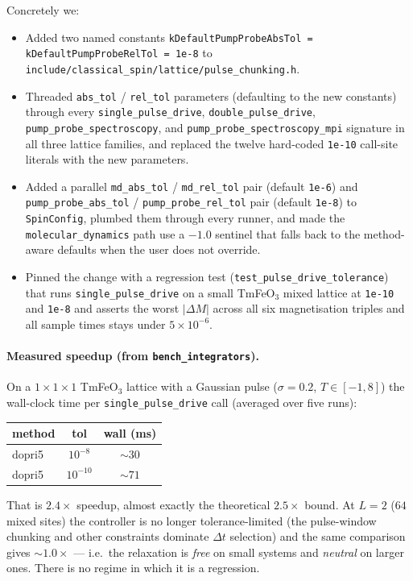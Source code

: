 \documentclass[11pt,letterpaper]{article}
\begin{document}
Concretely we:
\begin{itemize}
  \item Added two named constants
        \texttt{kDefaultPumpProbeAbsTol = kDefaultPumpProbeRelTol
        = 1e-8} to \texttt{include/classical\_spin/lattice/pulse\_chunking.h}.
  \item Threaded \texttt{abs\_tol} / \texttt{rel\_tol} parameters
        (defaulting to the new constants) through every
        \texttt{single\_pulse\_drive}, \texttt{double\_pulse\_drive},
        \texttt{pump\_probe\_spectroscopy}, and
        \texttt{pump\_probe\_spectroscopy\_mpi} signature in all
        three lattice families, and replaced the twelve hard-coded
        \texttt{1e-10} call-site literals with the new parameters.
  \item Added a parallel \texttt{md\_abs\_tol} / \texttt{md\_rel\_tol}
        pair (default \texttt{1e-6}) and
        \texttt{pump\_probe\_abs\_tol} / \texttt{pump\_probe\_rel\_tol}
        pair (default \texttt{1e-8}) to \texttt{SpinConfig}, plumbed
        them through every runner, and made the \texttt{molecular\_dynamics}
        path use a $-1.0$ sentinel that falls back to the
        method-aware defaults when the user does not override.
  \item Pinned the change with a regression test
        (\texttt{test\_pulse\_drive\_tolerance}) that runs
        \texttt{single\_pulse\_drive} on a small TmFeO$_3$ mixed
        lattice at \texttt{1e-10} and \texttt{1e-8} and asserts
        the worst $|\Delta M|$ across all six magnetisation triples
        and all sample times stays under $5 \times 10^{-6}$.
\end{itemize}

\paragraph{Measured speedup (from \texttt{bench\_integrators}).}
On a $1\times1\times1$ TmFeO$_3$ lattice with a Gaussian pulse
($\sigma = 0.2$, $T \in [-1, 8]$) the wall-clock time per
\texttt{single\_pulse\_drive} call (averaged over five runs):
\begin{center}
\begin{tabular}{lcc}
\hline
\textbf{method} & \textbf{tol} & \textbf{wall (ms)} \\
\hline
dopri5 & $10^{-8}$  & $\sim 30$ \\
dopri5 & $10^{-10}$ & $\sim 71$ \\
\hline
\end{tabular}
\end{center}
That is $\mathbf{2.4\times}$ speedup, almost exactly the
theoretical $2.5\times$ bound.  At $L = 2$ ($64$ mixed sites) the
controller is no longer tolerance-limited (the pulse-window
chunking and other constraints dominate $\Delta t$ selection) and
the same comparison gives $\sim 1.0\times$ --- i.e.\ the relaxation
is \emph{free} on small systems and \emph{neutral} on larger ones.
There is no regime in which it is a regression.
\end{document}
